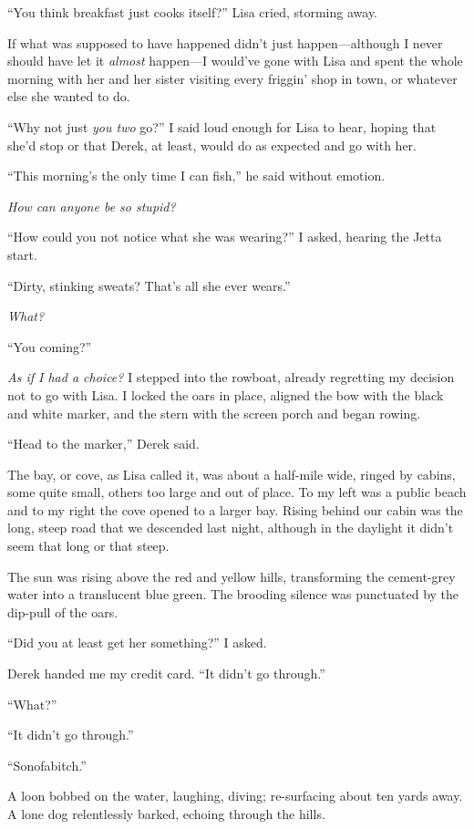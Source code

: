 ``You think breakfast just cooks itself?'' Lisa cried, storming away.

If what was supposed to have happened didn't just happen---although I
never should have let it \emph{almost} happen---I would've gone with
Lisa and spent the whole morning with her and her sister visiting every
friggin' shop in town, or whatever else she wanted to do.

``Why not just \emph{you two} go?'' I said loud enough for Lisa to hear,
hoping that she'd stop or that Derek, at least, would do as expected and
go with her.

``This morning's the only time I can fish,'' he said without emotion.

\emph{How can anyone be so stupid?}

``How could you not notice what she was wearing?'' I asked, hearing the
Jetta start.

``Dirty, stinking sweats? That's all she ever wears.''

\emph{What?}

``You coming?''

\emph{As if I had a choice?} I stepped into the rowboat, already
regretting my decision not to go with Lisa. I locked the oars in place,
aligned the bow with the black and white marker, and the stern with the
screen porch and began rowing.

``Head to the marker,'' Derek said.

The bay, or cove, as Lisa called it, was about a half-mile wide, ringed
by cabins, some quite small, others too large and out of place. To my
left was a public beach and to my right the cove opened to a larger bay.
Rising behind our cabin was the long, steep road that we descended last
night, although in the daylight it didn't seem that long or that steep.

The sun was rising above the red and yellow hills, transforming the
cement-grey water into a translucent blue green. The brooding silence
was punctuated by the dip-pull of the oars.

``Did you at least get her something?'' I asked.

Derek handed me my credit card. ``It didn't go through.''

``What?''

``It didn't go through.''

``Sonofabitch.''

A loon bobbed on the water, laughing, diving; re-surfacing about ten
yards away. A lone dog relentlessly barked, echoing through the hills.

